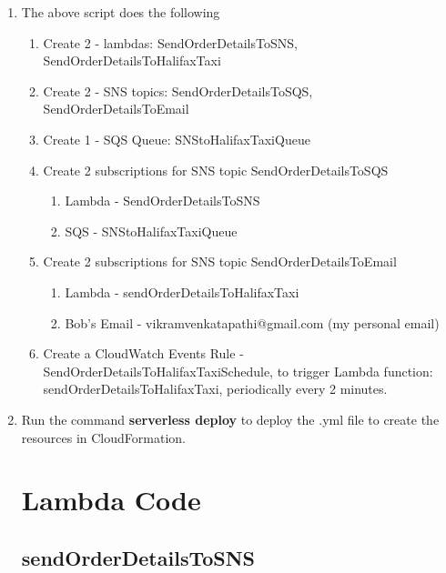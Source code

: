 \begin{enumerate}
\item The above script does the following
\begin{enumerate}
    \item Create 2 - lambdas: SendOrderDetailsToSNS, SendOrderDetailsToHalifaxTaxi
    \item Create 2 - SNS topics: SendOrderDetailsToSQS, SendOrderDetailsToEmail
    \item Create 1 - SQS Queue: SNStoHalifaxTaxiQueue
    \item Create 2 subscriptions for SNS topic SendOrderDetailsToSQS
    \begin{enumerate}
        \item Lambda - SendOrderDetailsToSNS
        \item SQS - SNStoHalifaxTaxiQueue
    \end{enumerate}
    \item Create 2 subscriptions for SNS topic SendOrderDetailsToEmail
    \begin{enumerate}
        \item Lambda - sendOrderDetailsToHalifaxTaxi
        \item Bob's Email - vikramvenkatapathi@gmail.com (my personal email)
    \end{enumerate}
    \item Create a CloudWatch Events Rule - SendOrderDetailsToHalifaxTaxiSchedule, to trigger Lambda function: sendOrderDetailsToHalifaxTaxi, periodically every 2 minutes.

\end{enumerate}
\item Run the command \textbf{serverless deploy} to deploy the .yml file to create the resources in CloudFormation.

\section{Lambda Code}
\subsection{sendOrderDetailsToSNS}




\end{enumerate}
